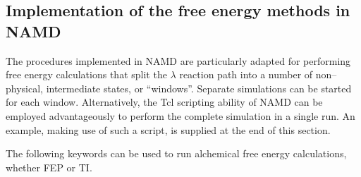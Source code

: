 \subsection{Implementation of the free energy methods in NAMD}
\label{section:fepparameters}


The procedures implemented in NAMD are particularly
adapted for performing free
energy calculations that split the $\lambda$
reaction path into a number of non--physical,
intermediate states, or ``windows''. Separate simulations
can be started for each window.
Alternatively, the {\sc Tcl} scripting ability of
NAMD can be employed advantageously
to perform the complete simulation in a single run.
An example, making use of such a script, is supplied at the end
of this section.

The following keywords can be used to run alchemical free
energy calculations, whether FEP or TI.  

